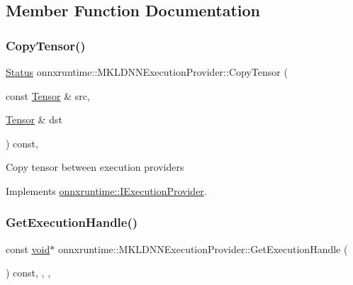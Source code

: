 \subsection{Member Function Documentation}
\mbox{\label{classonnxruntime_1_1MKLDNNExecutionProvider_a84adc2668cac60f53d2566e03b2080b0}} 
\subsubsection{\texorpdfstring{Copy\+Tensor()}{CopyTensor()}}
{\footnotesize\ttfamily \mbox{\hyperlink{classonnxruntime_1_1common_1_1Status}{Status}} onnxruntime\+::\+M\+K\+L\+D\+N\+N\+Execution\+Provider\+::\+Copy\+Tensor (\begin{DoxyParamCaption}\item[{const \mbox{\hyperlink{classonnxruntime_1_1Tensor}{Tensor}} \&}]{src,  }\item[{\mbox{\hyperlink{classonnxruntime_1_1Tensor}{Tensor}} \&}]{dst }\end{DoxyParamCaption}) const\hspace{0.3cm}{\ttfamily [override]}, {\ttfamily [virtual]}}

Copy tensor between execution providers 

Implements \mbox{\hyperlink{classonnxruntime_1_1IExecutionProvider_a2b9bb47c0d2d72598ceb381688adfe26}{onnxruntime\+::\+I\+Execution\+Provider}}.

\mbox{\label{classonnxruntime_1_1MKLDNNExecutionProvider_a8e47e298e1b0d6bd0b8bde10d6e1d7e4}} 
\subsubsection{\texorpdfstring{Get\+Execution\+Handle()}{GetExecutionHandle()}}
{\footnotesize\ttfamily const \mbox{\hyperlink{mlasi_8h_a88f941d423cb2a819b70a1358982b1a6}{void}}$\ast$ onnxruntime\+::\+M\+K\+L\+D\+N\+N\+Execution\+Provider\+::\+Get\+Execution\+Handle (\begin{DoxyParamCaption}{ }\end{DoxyParamCaption}) const\hspace{0.3cm}{\ttfamily [inline]}, {\ttfamily [override]}, {\ttfamily [virtual]}, {\ttfamily [noexcept]}}

